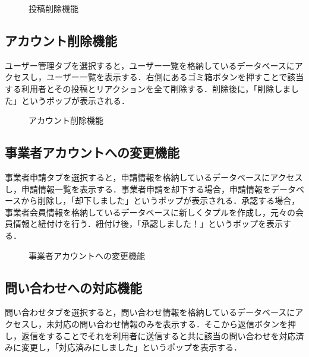 \begin{figure}[H]
    \centering
    
    \caption{投稿削除機能}
    \label{fig:delete_post}
\end{figure}

\subsection{アカウント削除機能}

ユーザー管理タブを選択すると，ユーザー一覧を格納しているデータベースにアクセスし，ユーザー一覧を表示する．右側にあるゴミ箱ボタンを押すことで該当する利用者とその投稿とリアクションを全て削除する．削除後に，「削除しました」というポップが表示される．

\begin{figure}[H]
    \centering
    
    \caption{アカウント削除機能}
    \label{fig:delete_user}
\end{figure}

\subsection{事業者アカウントへの変更機能}
事業者申請タブを選択すると，申請情報を格納しているデータベースにアクセスし，申請情報一覧を表示する．事業者申請を却下する場合，申請情報をデータベースから削除し，「却下しました」というポップが表示される．承認する場合，事業者会員情報を格納しているデータベースに新しくタプルを作成し，元々の会員情報と紐付けを行う．紐付け後，「承認しました！」というポップを表示する．

\begin{figure}[H]
    \centering
    
    \caption{事業者アカウントへの変更機能}
    \label{fig:business_account}
\end{figure}

\subsection{問い合わせへの対応機能}

問い合わせタブを選択すると，問い合わせ情報を格納しているデータベースにアクセスし，未対応の問い合わせ情報のみを表示する．そこから返信ボタンを押し，返信をすることでそれを利用者に送信すると共に該当の問い合わせを対応済みに変更し，「対応済みにしました」というポップを表示する．

